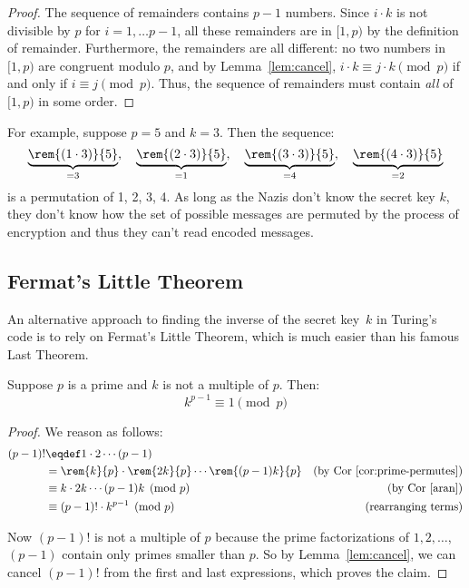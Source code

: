 \begin{proof}
The sequence of remainders contains $p-1$ numbers.  Since $i \cdot k$
is not divisible by $p$ for $i=1,\dots p-1$, all these remainders are
in $[1,p)$ by the definition of remainder.  Furthermore, the
  remainders are all different: no two numbers in $[1,p)$ are
    congruent modulo $p$, and by Lemma~\ref{lem:cancel}, $i \cdot k
    \equiv j \cdot k \pmod{p}$ if and only if $i \equiv j \pmod{p}$.
    Thus, the sequence of remainders must contain \emph{all} of
    $[1,p)$ in some order.
\end{proof}

For example, suppose $p = 5$ and $k = 3$.  Then the sequence:
%
\[
\underbrace{\rem{(1 \cdot 3)}{5}}_{=3},\quad
\underbrace{\rem{(2 \cdot 3)}{5}}_{=1},\quad
\underbrace{\rem{(3 \cdot 3)}{5}}_{=4},\quad
\underbrace{\rem{(4 \cdot 3)}{5}}_{=2}
\]
%
is a permutation of
1, 2, 3, 4.  As long as the Nazis don't know the secret key
$k$, they don't know how the set of possible messages are permuted by the
process of encryption and thus they can't read encoded messages.


\subsection{Fermat's Little Theorem}

An alternative approach to finding the inverse of the secret key~$k$
in Turing's code is to rely on Fermat's Little Theorem, which is much
easier than his famous Last Theorem.  \iffalse ---and more useful.\fi

\begin{theorem}\label{fermat_little}
Suppose $p$ is a prime and $k$ is not a multiple of $p$.  Then:
%
\[
k^{p-1} \equiv 1 \pmod{p}
\]
\end{theorem}

\begin{proof}
We reason as follows:
\begin{align*}
(p-1)! &\eqdef 1 \cdot 2 \cdots (p-1)\\
       & = \rem{k}{p} \cdot \rem{2k}{p} \cdots \rem{(p-1)k}{p}
           & \text{(by Cor~\ref{cor:prime-permutes})}\\
       & \equiv k \cdot 2k \cdots (p-1) k \pmod{p}
           & \text{(by Cor~\ref{aran})}\\
       & \equiv (p-1)! \cdot k^{p-1} \pmod{p}
           & \text{(rearranging terms)}\\
\end{align*}

Now $(p - 1)!$ is not a multiple of $p$ because the prime
factorizations of $1, 2, \dots$, $(p - 1)$ contain only primes smaller
than $p$.  So by Lemma~\ref{lem:cancel}, we can cancel $(p - 1)!$ from
the first and last expressions, which proves the claim.
\end{proof}


